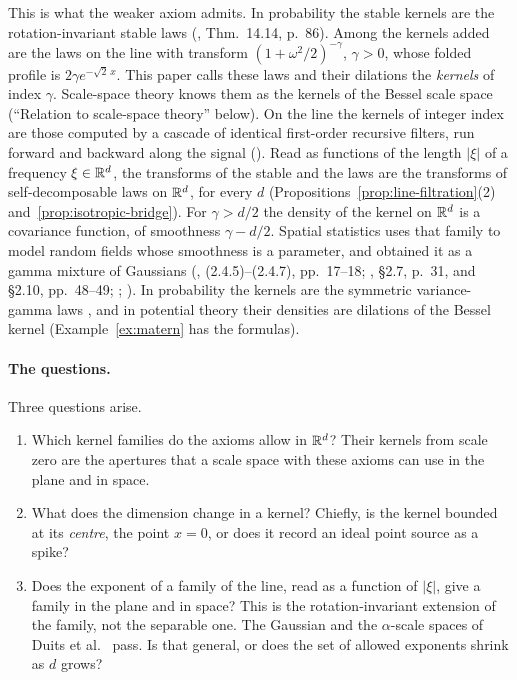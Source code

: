This is what the weaker axiom admits. In probability the stable kernels are the
rotation-invariant stable laws (, Thm.~14.14, p.~86). Among the kernels
added are the laws on the line with transform
$(1 + \omega^2/2)^{-\gamma}$, $\gamma > 0$, whose folded profile is $2\gamma e^{-\sqrt2\,x}$.
This paper calls these laws and their dilations the \emph{\Matern{} kernels} of index $\gamma$.
Scale-space theory knows them as the kernels of the Bessel scale space (``Relation to
scale-space theory'' below). On the line the kernels of integer index are those computed by a
cascade of identical first-order recursive filters, run forward and backward along the signal
(). Read as functions of the length $|\xi|$ of a frequency
$\xi \in \mathbb{R}^d$, the transforms of the stable and the \Matern{} laws are the
transforms of self-decomposable laws on $\mathbb{R}^d$, for every $d$
(Propositions~\ref{prop:line-filtration}(2) and~\ref{prop:isotropic-bridge}). For
$\gamma > d/2$ the density of the \Matern{} kernel on $\mathbb{R}^d$ is a \Matern{} covariance
function, of smoothness $\gamma - d/2$. Spatial statistics uses that family to model random
fields whose smoothness is a parameter, and \Matern{} obtained it as a gamma mixture of
Gaussians (, (2.4.5)--(2.4.7), pp.~17--18;
, \S2.7, p.~31, and \S2.10, pp.~48--49;
; ). In probability the \Matern{} kernels are
the symmetric variance-gamma laws , and in potential theory their
densities are dilations of the Bessel kernel 
(Example~\ref{ex:matern} has the formulas).

\paragraph{The questions.} Three questions arise.
\begin{enumerate}
\item Which kernel families do the axioms allow in $\mathbb{R}^d$? Their kernels from scale zero are
the apertures that a scale space with these axioms can use in the plane and in space.
\item What does the dimension change in a kernel? Chiefly, is the kernel bounded at its
\emph{centre}, the point $x = 0$, or does it record an ideal point source as a spike?
\item Does the exponent of a family of the line, read as a function of $|\xi|$, give a family in
the plane and in space? This is the rotation-invariant extension of the family, not the
separable one. The Gaussian and the $\alpha$-scale spaces of Duits et al.\
 pass. Is that general,
or does the set of allowed exponents shrink as $d$ grows?
\end{enumerate}

